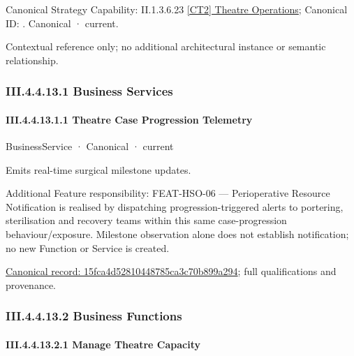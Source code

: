 {\small Canonical Strategy Capability: II.1.3.6.23 \hyperref[element:4bf7a8260e1444fdac44e97c3557b533]{[CT2] Theatre Operations}; Canonical ID: \texttt{}. Canonical · current.}\par
Contextual reference only; no additional architectural instance or semantic relationship.\par
\subsubsection*{III.4.4.13.1 Business Services}
\label{navigation:III.4.4.13.1}

\paragraph*{III.4.4.13.1.1 Theatre Case Progression Telemetry}
\label{navigation:III.4.4.13.1.1}

\label{element:15fca4d52810448785ca3c70b899a294}
{\small BusinessService · Canonical · current}\par

Emits real-time surgical milestone updates.



Additional Feature responsibility: FEAT-HSO-06 — Perioperative Resource Notification is realised by dispatching progression-triggered alerts to portering, sterilisation and recovery teams within this same case-progression behaviour/exposure. Milestone observation alone does not establish notification; no new Function or Service is created.


{\footnotesize \href{../../../../continuum/business/business-service/15fca4d52810448785ca3c70b899a294.md}{Canonical record: 15fca4d52810448785ca3c70b899a294}; full qualifications and provenance.}\par
\subsubsection*{III.4.4.13.2 Business Functions}
\label{navigation:III.4.4.13.2}

\paragraph*{III.4.4.13.2.1 Manage Theatre Capacity}
\label{navigation:III.4.4.13.2.1}

